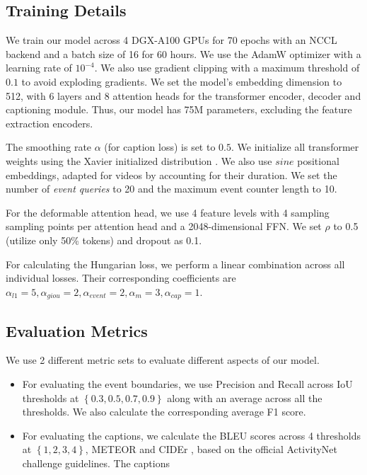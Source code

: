 \subsection {Training Details}
\par We train our model across 4 DGX-A100 GPUs for 70 epochs with an NCCL backend and a batch size of 16 for 60 hours. We use the AdamW optimizer with a learning rate of $10^{-4}$. We also use gradient clipping with a maximum threshold of $0.1$ to avoid exploding gradients. We set the model's embedding dimension to 512, with 6 layers and 8 attention heads for the transformer encoder, decoder and captioning module. Thus, our model has 75M parameters, excluding the feature extraction encoders. 
\par The smoothing rate $\alpha$ (for caption loss) is set to $0.5$. We initialize all transformer weights using the Xavier initialized distribution \cite{xavier}. We also use $sine$ positional embeddings, adapted for videos by accounting for their duration. We set the number of \textit{event queries} to 20 and the maximum event counter length to 10.
\par For the deformable attention head, we use 4 feature levels with 4 sampling sampling points per attention head and a 2048-dimensional FFN. We set $\rho$ to 0.5 (utilize only 50\% tokens) and dropout as 0.1.
\par For calculating the Hungarian loss, we perform a linear combination across all individual losses. Their corresponding coefficients are $\alpha_{l1}=5, \alpha_{giou}=2, \alpha_{event}=2, \alpha_m=3, \alpha_{cap}=1$.

\subsection {Evaluation Metrics}
\par We use 2 different metric sets to evaluate different aspects of our model.
\begin{itemize}
	\item For evaluating the event boundaries, we use Precision and Recall across IoU thresholds at $\left \{0.3, 0.5, 0.7, 0.9 \right\}$ along with an average across all the thresholds. We also calculate the corresponding average F1 score.
	\item For evaluating the captions, we calculate the BLEU \cite{bleu} scores across 4 thresholds at $\left \{1, 2, 3, 4\right\}$, METEOR \cite{meteor} and CIDEr \cite{cider}, based on the official ActivityNet challenge guidelines. The captions
\end{itemize}

